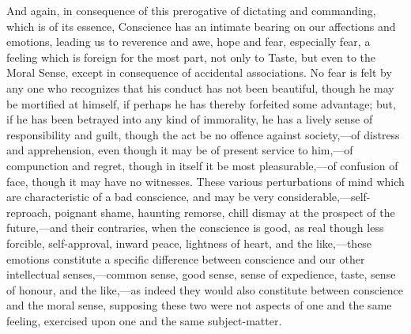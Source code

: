And again, in consequence of this prerogative of dictating and
commanding, which is of its essence, Conscience has an intimate
bearing on our affections and emotions, leading us to reverence and
awe, hope and fear, especially fear, a feeling which is foreign for
the most part, not only to Taste, but even to the Moral Sense, except
in consequence of accidental associations. No fear is felt by any one
who recognizes that his conduct has not been beautiful, though he may
be mortified at himself, if perhaps he has thereby forfeited some
advantage; but, if he has been betrayed into any kind of immorality,
he has a lively sense of responsibility and guilt, though the act be
no offence against society,—of distress and apprehension, even
though it may be of present service to him,—of compunction and
regret, though in itself it be most pleasurable,—of confusion of
face, though it may have no witnesses. These various perturbations of
mind which are characteristic of a bad conscience, and may be very
considerable,—self-reproach, poignant shame, haunting remorse, chill
dismay at the prospect of the future,—and their contraries, when the
conscience is good, as real though less forcible, self-approval,
inward peace, lightness of heart, and the like,—these emotions
constitute a specific difference between conscience and our other
intellectual senses,—common sense, good sense, sense of expedience,
taste, sense of honour, and the like,—as indeed they would also
constitute between conscience and the moral sense, supposing these two
were not aspects of one and the same feeling, exercised upon one and
the same subject-matter.

